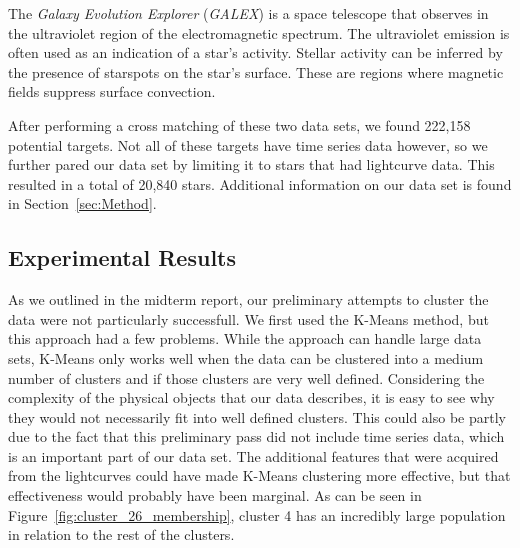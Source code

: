 \documentclass[12pt]{article}
\begin{document}
The \textit{Galaxy Evolution Explorer} (\textit{GALEX}) is a space telescope that observes in the ultraviolet region of the electromagnetic spectrum.
The ultraviolet emission is often used as an indication of a star's activity.
Stellar activity can be inferred by the presence of starspots on the star's surface.
These are regions where magnetic fields suppress surface convection.

After performing a cross matching of these two data sets, we found 222,158 potential targets.
Not all of these targets have time series data however, so we further pared our data set by limiting it to stars that had lightcurve data.
This resulted in a total of 20,840 stars.
Additional information on our data set is found in Section~\ref{sec:Method}.


\subsection{Experimental Results} %
\label{sub:Experimental Results}
As we outlined in the midterm report, our preliminary attempts to cluster the data were not particularly successfull.
We first used the K-Means method, but this approach had a few problems.
While the approach can handle large data sets, K-Means only works well when the data can be clustered into a medium number of clusters and if those clusters are very well defined.
Considering the complexity of the physical objects that our data describes, it is easy to see why they would not necessarily fit into well defined clusters.
This could also be partly due to the fact that this preliminary pass did not include time series data, which is an important part of our data set.
The additional features that were acquired from the lightcurves could have made K-Means clustering more effective, but that effectiveness would probably have been marginal.
As can be seen in Figure~\ref{fig:cluster_26_membership}, cluster 4 has an incredibly large population in relation to the rest of the clusters.
\end{document}
